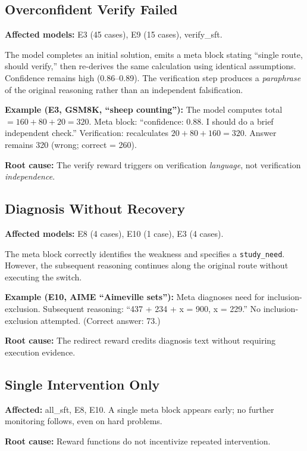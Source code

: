 \documentclass[11pt,a4paper]{article}
\newcommand{\tok}[1]{\texttt{#1}}
\begin{document}
\subsection{Overconfident Verify Failed}

\textbf{Affected models:} E3 (45 cases), E9 (15 cases), verify\_sft.

The model completes an initial solution, emits a meta block stating ``single route, should verify,'' then re-derives the same calculation using identical assumptions. Confidence remains high (0.86--0.89). The verification step produces a \emph{paraphrase} of the original reasoning rather than an independent falsification.

\textbf{Example (E3, GSM8K, ``sheep counting''):} The model computes total $= 160 + 80 + 20 = 320$. Meta block: ``confidence: 0.88. I should do a brief independent check.'' Verification: recalculates $20 + 80 + 160 = 320$. Answer remains 320 (wrong; correct = 260).

\textbf{Root cause:} The verify reward triggers on verification \emph{language}, not verification \emph{independence}.

\subsection{Diagnosis Without Recovery}

\textbf{Affected models:} E8 (4 cases), E10 (1 case), E3 (4 cases).

The meta block correctly identifies the weakness and specifies a \tok{study\_need}. However, the subsequent reasoning continues along the original route without executing the switch.

\textbf{Example (E10, AIME ``Aimeville sets''):} Meta diagnoses need for inclusion-exclusion. Subsequent reasoning: ``437 + 234 + x = 900, x = 229.'' No inclusion-exclusion attempted. (Correct answer: 73.)

\textbf{Root cause:} The redirect reward credits diagnosis text without requiring execution evidence.

\subsection{Single Intervention Only}

\textbf{Affected:} all\_sft, E8, E10. A single meta block appears early; no further monitoring follows, even on hard problems.

\textbf{Root cause:} Reward functions do not incentivize repeated intervention.
\end{document}
